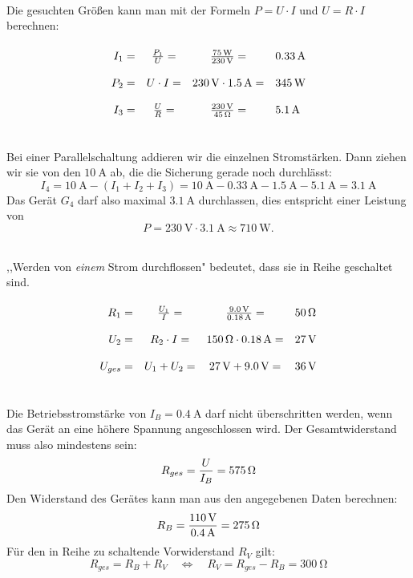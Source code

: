 \documentclass[a4paper]{article}
\begin{document}
\vspace{0.5 cm}

\\
Die gesuchten Größen kann man mit der Formeln $P = U \cdot I$ und $U = R \cdot I$ berechnen:
$$
\renewcommand{\arraystretch}{2}
\begin{array}{rccl}
I_1 =& { P_1 \over U} =& {\SI{75}{\watt}\over \SI{230}{\volt} }=& \SI{0,33}{\ampere} \\
P_2 =& U \cdot I =& \SI{230}{\volt} \cdot  \SI{1,5}{\ampere} =&  \SI{345}{\watt} \\
I_3 =& {U \over R} =& {\SI{230}{\volt} \over  \SI{45}{\ohm} }=&  \SI{5,1}{\ampere} 
\end{array}
$$
\vspace{0.5 cm}

\\
Bei einer Parallelschaltung addieren wir die einzelnen Stromstärken. Dann ziehen wir sie von den $\SI{10}{\ampere}$ ab, die die Sicherung gerade noch durchlässt:
$$I_4 =  \SI{10}{\ampere} - (I_1+I_2+I_3)= \SI{10}{\ampere} -  \SI{0,33}{\ampere} -  \SI{1,5}{\ampere} -  \SI{5,1}{\ampere} =  \SI{3,1}{\ampere}$$
Das Gerät $G_4$ darf also maximal $\SI{3,1}{\ampere}$ durchlassen, dies entspricht einer Leistung von 
$$P= \SI{230}{\volt} \cdot  \SI{3,1}{\ampere} \approx  \SI{710}{\watt}.$$
\vspace{0.5 cm}

\\
,,Werden von {\it einem} Strom durchflossen" bedeutet, dass sie in Reihe geschaltet sind.
$$
\renewcommand{\arraystretch}{2}
\begin{array}{rccl}
R_1 =& {U_1 \over I} =& { \SI{9,0}{\volt} \over \SI{0,18}{\ampere}}=&  \SI{50}{\ohm} \\
U_2 =& R_2 \cdot I =&  \SI{150}{\ohm} \cdot  \SI{0,18}{\ampere} =& \SI{27}{\volt}\\
U_{ges}=& U_1 +U_2 =& \SI{27}{\volt} + \SI{9,0}{\volt}=& \SI{36}{\volt}
\end{array}
$$
\vspace{0.5 cm}

\\
Die Betriebsstromstärke von $I_B=\SI{0,4}{\ampere}$ darf nicht überschritten werden, wenn das Gerät an eine höhere Spannung angeschlossen wird. Der Gesamtwiderstand muss also mindestens sein:
$$R_{ges}={U \over I_B}=\SI{575}{\ohm}$$
Den Widerstand des Gerätes kann man aus den angegebenen Daten berechnen:
$$R_B = {\SI{110}{\volt} \over  \SI{0,4}{\ampere}}= \SI{275}{\ohm}$$
Für den in Reihe zu schaltende Vorwiderstand $R_V$ gilt:
$$R_{ges}= R_B + R_V \quad \Leftrightarrow \quad R_V= R_{ges}-R_B=\SI{300}{\ohm}$$
\vspace{0.5 cm}
\end{document}
